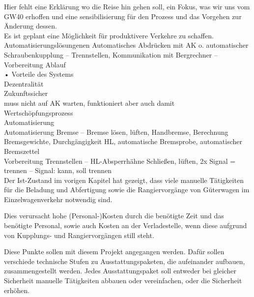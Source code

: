 Hier fehlt eine Erklärung wo die Reise hin gehen soll, ein Fokus, was wir uns vom GW40 erhoffen und eine sensibilisierung für den Prozess und das Vorgehen zur Änderung dessen.\\
Es ist geplant eine Möglichkeit für produktivere Verkehre zu schaffen.\\
Automatisierungslösungenen  Automatisches Abdrücken mit AK o. automatischer Schraubenkupplung – Trennstellen, Kommunikation mit Bergrechner – Vorbereitung Ablauf\\
• Vorteile des Systems\\
Dezentralität\\
Zukunftssicher\\
muss nicht auf AK warten, funktioniert aber auch damit\\
Wertschöpfungsprozess\\
Automatisierung\\
Automatisierung Bremse – Bremse lösen, lüften, Handbremse, Berechnung Bremsgewichte, Durchgängigkeit HL, automatische Bremsprobe, automatischer Bremszettel\\
Vorbereitung Trennstellen – HL-Absperrhähne Schließen, lüften, 2x Signal = trennen – Signal: kann, soll trennen\\
Der Ist-Zustand im vorigen Kapitel hat gezeigt, dass viele manuelle Tätigkeiten für die Beladung und Abfertigung sowie die Rangiervorgänge von Güterwagen im Einzelwagenverkehr notwendig sind.\par
Dies verursacht hohe (Personal-)Kosten durch die benötigte Zeit und das benötigte Personal, sowie auch Kosten an der Verladestelle, wenn diese aufgrund von Kupplungs- und Rangiervorgängen still steht.\par
Diese Punkte sollen mit diesem Projekt angegangen werden. Dafür sollen verschiede technische Stufen zu Ausstattungspaketen, die aufeinander aufbauen, zusammengestellt werden. Jedes Ausstattungspaket soll entweder bei gleicher Sicherheit manuelle Tätigkeiten abbauen oder vereinfachen, oder die Sicherheit erhöhen.\par